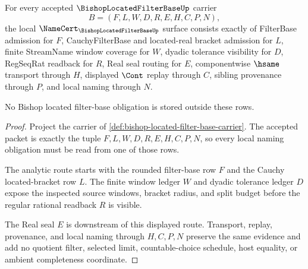 \begin{theorem}
\label{thm:bishop-located-filter-base-namecert-obligations}
For every accepted $\BishopLocatedFilterBaseUp$ carrier
$$
B=(F,L,W,D,R,E,H,C,P,N),
$$
the local $\NameCert_{\BishopLocatedFilterBaseUp}$ surface consists exactly of FilterBase admission for $F$, CauchyFilterBase and located-real bracket admission for $L$, finite StreamName window coverage for $W$, dyadic tolerance visibility for $D$, RegSeqRat readback for $R$, Real seal routing for $E$, componentwise $\hsame$ transport through $H$, displayed $\Cont$ replay through $C$, sibling provenance through $P$, and local naming through $N$.

No Bishop located filter-base obligation is stored outside these rows.
\end{theorem}
\begin{proof}
Project the carrier of \autoref{def:bishop-located-filter-base-carrier}. The accepted packet is exactly the tuple $F,L,W,D,R,E,H,C,P,N$, so every local naming obligation must be read from one of those rows.

The analytic route starts with the rounded filter-base row $F$ and the Cauchy located-bracket row $L$. The finite window ledger $W$ and dyadic tolerance ledger $D$ expose the inspected source windows, bracket radius, and split budget before the regular rational readback $R$ is visible.

The Real seal $E$ is downstream of this displayed route. Transport, replay, provenance, and local naming through $H,C,P,N$ preserve the same evidence and add no quotient filter, selected limit, countable-choice schedule, host equality, or ambient completeness coordinate.
\end{proof}

